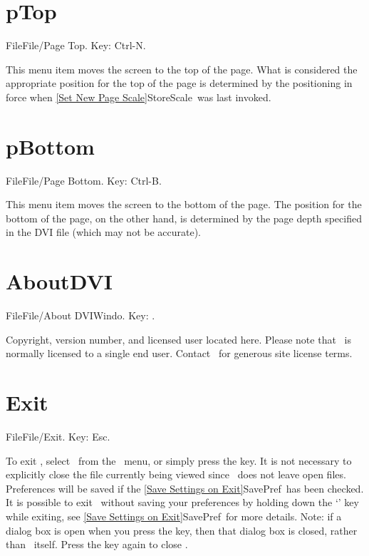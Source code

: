 \newpage

\section{pTop}{File}File/Page Top. Key: Ctrl-N.

This menu item moves the screen to the top of the page. What is
considered the appropriate position for the top of the page is
determined by the positioning in force when \ref{Set New Page
Scale}{StoreScale}\ was last invoked.
   \bigskip

\section{pBottom}{File}File/Page Bottom. Key: Ctrl-B.

This menu item moves the screen to the bottom of the page. The position
for the bottom of the page, on the other hand, is determined by the page
depth specified in the DVI file (which may not be accurate).
   \bigskip

\newpage

\section{AboutDVI}{File}File/About DVIWindo\copyrght. Key: \none.

Copyright, version number, and licensed user located here.
Please note that \ is normally licensed to a single
end user.  Contact \ for generous site license terms.
   \bigskip

\section{Exit}{File}File/Exit. Key: Esc.

To exit , select \ from the \ menu, or simply
press the  key.  It is not necessary to explicitly close the file
currently being viewed since \ does not leave open files.
Preferences will be saved if the 
\ref{Save Settings on Exit}{SavePref}\ 
has been checked.
   \bigskip
It is possible to exit \ without saving your preferences 
by holding down the `\key{Shift}' key while exiting, see
\ref{Save Settings on Exit}{SavePref}\ 
for more details.
   \bigskip
Note: if a dialog box is open when you press the  key, then that
dialog box is closed, rather than \ itself.
Press the \key{Esc} key again to close \hb{DVIWindo}.

